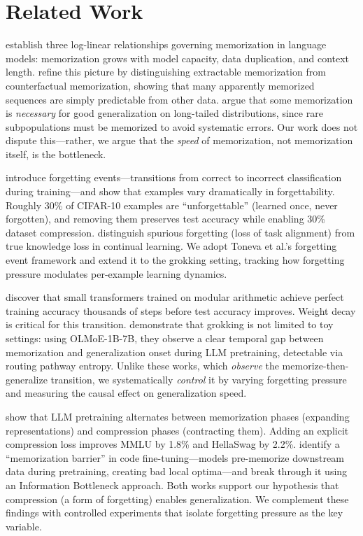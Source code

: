 \section{Related Work}
\label{sec:related}

\citet{carlini2023quantifying} establish three log-linear relationships governing memorization in language models: memorization grows with model capacity, data duplication, and context length. \citet{zhang2023counterfactual} refine this picture by distinguishing extractable memorization from counterfactual memorization, showing that many apparently memorized sequences are simply predictable from other data. \citet{feldman2020does} argue that some memorization is \emph{necessary} for good generalization on long-tailed distributions, since rare subpopulations must be memorized to avoid systematic errors. Our work does not dispute this---rather, we argue that the \emph{speed} of memorization, not memorization itself, is the bottleneck.

\citet{toneva2019empirical} introduce forgetting events---transitions from correct to incorrect classification during training---and show that examples vary dramatically in forgettability. Roughly 30\% of CIFAR-10 examples are ``unforgettable'' (learned once, never forgotten), and removing them preserves test accuracy while enabling 30\% dataset compression. \citet{zheng2025spurious} distinguish spurious forgetting (loss of task alignment) from true knowledge loss in continual learning. We adopt Toneva et al.'s forgetting event framework and extend it to the grokking setting, tracking how forgetting pressure modulates per-example learning dynamics.

\citet{power2022grokking} discover that small transformers trained on modular arithmetic achieve perfect training accuracy thousands of steps before test accuracy improves. Weight decay is critical for this transition. \citet{li2025grokking} demonstrate that grokking is not limited to toy settings: using OLMoE-1B-7B, they observe a clear temporal gap between memorization and generalization onset during LLM pretraining, detectable via routing pathway entropy. Unlike these works, which \emph{observe} the memorize-then-generalize transition, we systematically \emph{control} it by varying forgetting pressure and measuring the causal effect on generalization speed.

\citet{yu2025memorization} show that LLM pretraining alternates between memorization phases (expanding representations) and compression phases (contracting them). Adding an explicit compression loss improves MMLU by 1.8\% and HellaSwag by 2.2\%. \citet{wang2025breaking} identify a ``memorization barrier'' in code fine-tuning---models pre-memorize downstream data during pretraining, creating bad local optima---and break through it using an Information Bottleneck approach. Both works support our hypothesis that compression (a form of forgetting) enables generalization. We complement these findings with controlled experiments that isolate forgetting pressure as the key variable.

